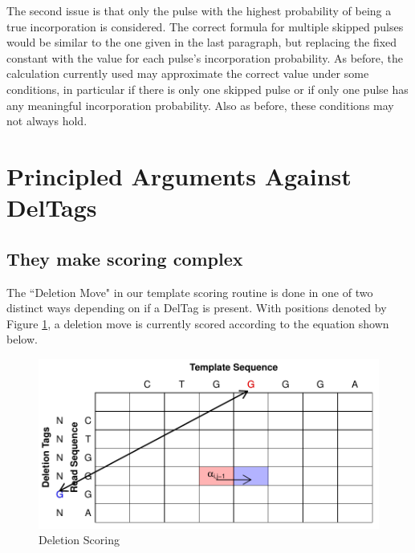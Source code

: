 \documentclass[fleqn,10pt]{SelfArx} %
\begin{document}
The second issue is that only the pulse with the highest probability of being a true incorporation is considered.  The correct formula for multiple skipped pulses would be similar to the one given in the last paragraph, but replacing the fixed constant with the value for each pulse's incorporation probability.  As before, the calculation currently used may approximate the correct value under some conditions, in particular if there is only one skipped pulse or if only one pulse has any meaningful incorporation probability.  Also as before, these conditions may not always hold. 


 




\section{Principled Arguments Against DelTags}



\subsection{They make scoring complex}

The ``Deletion Move" in our template scoring routine is done in one of two distinct ways depending on if a DelTag is present.  With positions denoted by Figure \ref{fig:del}, a deletion move is currently scored according to the equation shown below.  

\begin{figure}[ht]\centering %
\includegraphics[width=\linewidth]{Deletion}
\caption{Deletion Scoring}
\label{fig:del}
\end{figure}
\end{document}
